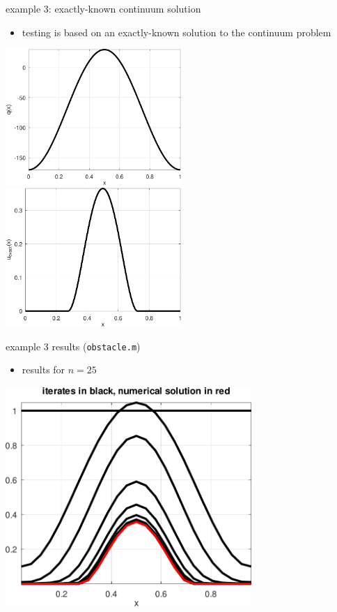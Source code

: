 \documentclass[10pt,hyperref,dvipsnames]{beamer}
\begin{document}
\begin{frame}{example 3: exactly-known continuum solution}

\begin{itemize}
\item testing is based on an exactly-known solution to the continuum problem
\end{itemize}

\medskip
\noindent
\hspace{-5mm}
\mbox{\includegraphics[width=0.5\textwidth]{figs/qobstacle.pdf} \qquad \includegraphics[width=0.5\textwidth]{figs/uexactobstacle.pdf}}
\end{frame}


\begin{frame}{example 3 results (\texttt{obstacle.m})}

\begin{itemize}
\item results for $n=25$
\end{itemize}

\medskip
\begin{center}
\includegraphics[width=0.7\textwidth]{figs/iteratesobstacle.pdf}
\end{center}
\end{frame}
\end{document}
